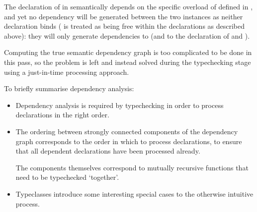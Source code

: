 \documentclass[dissertation.tex]{subfiles}
\begin{document}
{{\begin{itemize}
{            The declaration of  in  semantically depends on the specific overload of  defined in , and yet no dependency will be generated between the two instances as neither declaration binds  ( is treated as being free within the declarations as described above): they will only generate dependencies to  (and to the declaration of  and ).

            Computing the true semantic dependency graph is too complicated to be done in this pass, so the problem is left and instead solved during the typechecking stage using a just-in-time processing approach.
        }
        \end{itemize}

        To briefly summarise dependency analysis:

        \begin{itemize}
        \item Dependency analysis is required by typechecking in order to process declarations in the right order.
        \item
        {
            The ordering between strongly connected components of the dependency graph corresponds to the order in which to process declarations, to ensure that all dependent declarations have been processed already.
            
            The components themselves correspond to mutually recursive functions that need to be typechecked `together'.
        }
        \item Typeclasses introduce some interesting special cases to the otherwise intuitive process.
        \end{itemize}
    }
}
\end{document}
